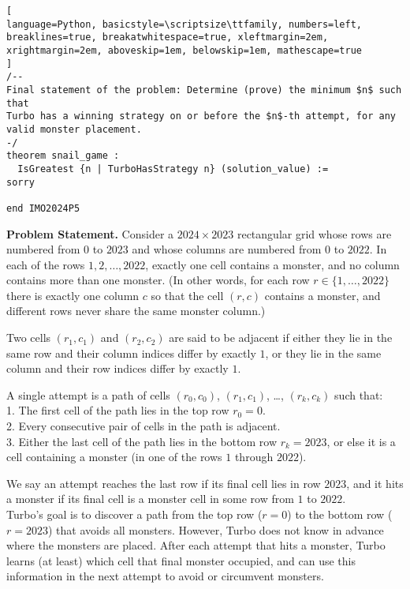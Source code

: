 \begin{tcolorbox}
\begin{lstlisting}[
language=Python, basicstyle=\scriptsize\ttfamily, numbers=left, breaklines=true, breakatwhitespace=true, xleftmargin=2em, xrightmargin=2em, aboveskip=1em, belowskip=1em, mathescape=true
]
/--
Final statement of the problem: Determine (prove) the minimum $n$ such that
Turbo has a winning strategy on or before the $n$-th attempt, for any
valid monster placement.
-/
theorem snail_game :
  IsGreatest {n | TurboHasStrategy n} (solution_value) :=
sorry

end IMO2024P5
\end{lstlisting}
\end{tcolorbox}

\begin{tcolorbox}[enhanced, breakable, rounded corners,
    colback=green!5!white, colframe=green!75!black,
    colbacktitle=green!85!black, fonttitle=\bfseries, coltitle=white, title=2024 IMO Problem 5 Back-translation]
\setlength{\parskip}{1em}
\textbf{Problem Statement.} Consider a \(2024\times 2023\) rectangular grid whose rows are numbered from \(0\) to \(2023\) and whose columns are numbered from \(0\) to \(2022\). In each of the rows \(1, 2, \ldots, 2022\), exactly one cell contains a monster, and no column contains more than one monster. (In other words, for each row \(r\in\{1,\dots,2022\}\) there is exactly one column \(c\) so that the cell \((r,c)\) contains a monster, and different rows never share the same monster column.)

Two cells \((r_1, c_1)\) and \((r_2, c_2)\) are said to be adjacent if either they lie in the same row and their column indices differ by exactly \(1\), or they lie in the same column and their row indices differ by exactly \(1\).

A single attempt is a path of cells \((r_0,c_0)\), \((r_1,c_1)\), \dots, \((r_k,c_k)\) such that:\\
1. The first cell of the path lies in the top row \(r_0=0\).\\
2. Every consecutive pair of cells in the path is adjacent. \\
3. Either the last cell of the path lies in the bottom row \(r_k=2023\), or else it is a cell containing a monster (in one of the rows \(1\) through \(2022\)).

We say an attempt reaches the last row if its final cell lies in row \(2023\), and it hits a monster if its final cell is a monster cell in some row from \(1\) to \(2022\).\\
Turbo's goal is to discover a path from the top row (\(r=0\)) to the bottom row (\(r=2023\)) that avoids all monsters. However, Turbo does not know in advance where the monsters are placed. After each attempt that hits a monster, Turbo learns (at least) which cell that final monster occupied, and can use this information in the next attempt to avoid or circumvent monsters.


\end{tcolorbox}
